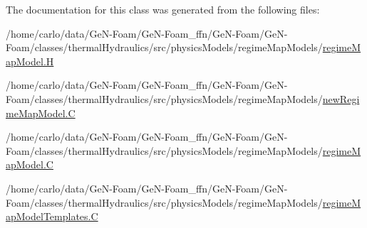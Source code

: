 The documentation for this class was generated from the following files\+:\begin{DoxyCompactItemize}
\item 
/home/carlo/data/\+Ge\+N-\/\+Foam/\+Ge\+N-\/\+Foam\+\_\+ffn/\+Ge\+N-\/\+Foam/\+Ge\+N-\/\+Foam/classes/thermal\+Hydraulics/src/physics\+Models/regime\+Map\+Models/\hyperlink{regimeMapModel_8H}{regime\+Map\+Model.\+H}\item 
/home/carlo/data/\+Ge\+N-\/\+Foam/\+Ge\+N-\/\+Foam\+\_\+ffn/\+Ge\+N-\/\+Foam/\+Ge\+N-\/\+Foam/classes/thermal\+Hydraulics/src/physics\+Models/regime\+Map\+Models/\hyperlink{newRegimeMapModel_8C}{new\+Regime\+Map\+Model.\+C}\item 
/home/carlo/data/\+Ge\+N-\/\+Foam/\+Ge\+N-\/\+Foam\+\_\+ffn/\+Ge\+N-\/\+Foam/\+Ge\+N-\/\+Foam/classes/thermal\+Hydraulics/src/physics\+Models/regime\+Map\+Models/\hyperlink{regimeMapModel_8C}{regime\+Map\+Model.\+C}\item 
/home/carlo/data/\+Ge\+N-\/\+Foam/\+Ge\+N-\/\+Foam\+\_\+ffn/\+Ge\+N-\/\+Foam/\+Ge\+N-\/\+Foam/classes/thermal\+Hydraulics/src/physics\+Models/regime\+Map\+Models/\hyperlink{regimeMapModelTemplates_8C}{regime\+Map\+Model\+Templates.\+C}\end{DoxyCompactItemize}
